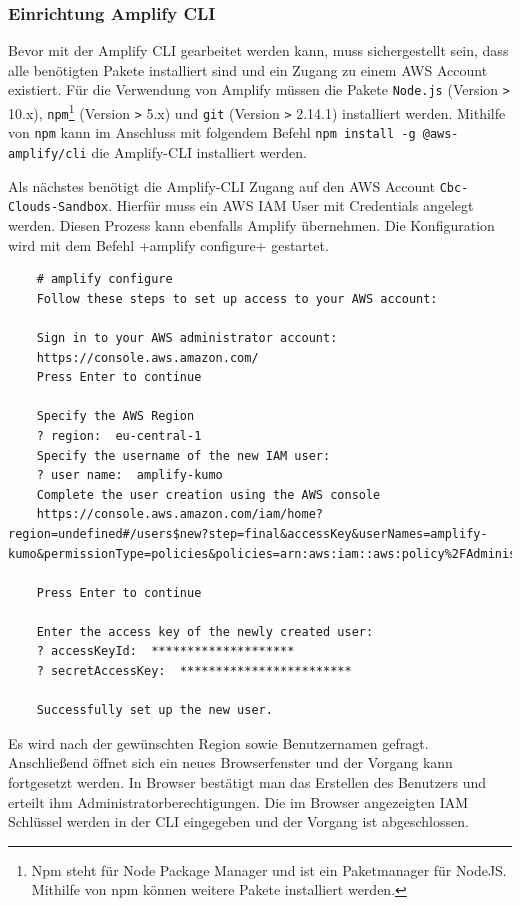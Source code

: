 \subsubsection{Einrichtung Amplify CLI}
\label{EinrichtungAmplify}
Bevor mit der Amplify CLI gearbeitet werden kann, muss sichergestellt sein, dass alle benötigten Pakete installiert sind und ein Zugang zu einem AWS Account existiert.
Für die Verwendung von Amplify müssen die Pakete \verb+Node.js+ (Version \verb+>+ 10.x), \verb+npm+\footnote{Npm steht für Node Package Manager und ist ein Paketmanager für NodeJS. Mithilfe von npm können weitere Pakete installiert werden.} (Version \verb+>+ 5.x) und \verb+git+ (Version \verb+>+ 2.14.1) installiert werden.
Mithilfe von \verb+npm+ kann im Anschluss mit folgendem Befehl \verb+npm install -g @aws-amplify/cli+ die Amplify-CLI installiert werden.

Als nächstes benötigt die Amplify-CLI Zugang auf den AWS Account \verb+Cbc-Clouds-Sandbox+.
Hierfür muss ein AWS IAM User mit Credentials angelegt werden.
Diesen Prozess kann ebenfalls Amplify übernehmen.
Die Konfiguration wird mit dem Befehl \spverb+amplify configure+ gestartet.

\begin{verbatim}
    # amplify configure
    Follow these steps to set up access to your AWS account:

    Sign in to your AWS administrator account:
    https://console.aws.amazon.com/
    Press Enter to continue

    Specify the AWS Region
    ? region:  eu-central-1
    Specify the username of the new IAM user:
    ? user name:  amplify-kumo
    Complete the user creation using the AWS console
    https://console.aws.amazon.com/iam/home?region=undefined#/users$new?step=final&accessKey&userNames=amplify-kumo&permissionType=policies&policies=arn:aws:iam::aws:policy%2FAdministratorAccess

    Press Enter to continue

    Enter the access key of the newly created user:
    ? accessKeyId:  ********************
    ? secretAccessKey:  ************************

    Successfully set up the new user.
  \end{verbatim}

Es wird nach der gewünschten Region sowie Benutzernamen gefragt.
Anschließend öffnet sich ein neues Browserfenster und der Vorgang kann fortgesetzt werden.
In Browser bestätigt man das Erstellen des Benutzers und erteilt ihm Administratorberechtigungen.
Die im Browser angezeigten IAM Schlüssel werden in der CLI eingegeben und der Vorgang ist abgeschlossen.\cite[]{ImpVoraus}

